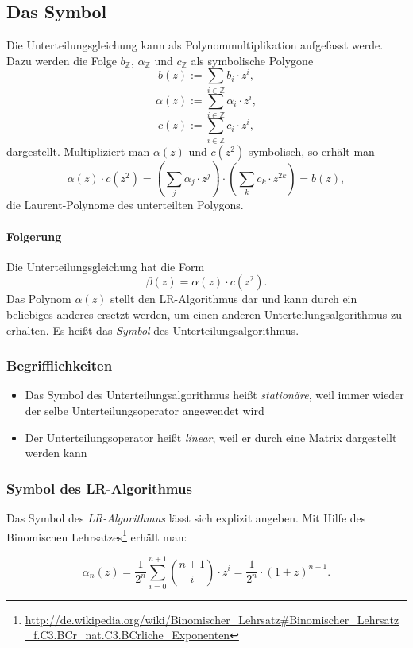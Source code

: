 \subsection{Das Symbol}
Die Unterteilungsgleichung kann als Polynommultiplikation aufgefasst werde. Dazu werden die Folge \(b_{\mathbb{Z}}\), \(\alpha_{\mathbb{Z}}\) und \(c_{\mathbb{Z}}\) als symbolische Polygone
\[b(z) := \sum_{i \in \mathbb{Z}} b_i \cdot z^i,\]
\[\alpha(z) := \sum_{i \in \mathbb{Z}} \alpha_i \cdot z^i,\]
\[c(z) := \sum_{i \in \mathbb{Z}} c_i \cdot z^i,\]
dargestellt. Multipliziert man \(\alpha(z)\) und \(c(z^2)\) symbolisch, so erhält man
\[\alpha(z) \cdot c(z^2) = \left(\sum_j \alpha_j\cdot z^j\right) \cdot \left(\sum_k c_k\cdot z^{2k}\right) = b(z),\]
die Laurent-Polynome des unterteilten Polygons.

\paragraph{Folgerung} Die Unterteilungsgleichung hat die Form
\[\beta(z) = \alpha(z)\cdot c(z^2).\]
Das Polynom \(\alpha(z)\) stellt den LR-Algorithmus dar und kann durch ein beliebiges anderes ersetzt werden, um einen anderen Unterteilungsalgorithmus zu erhalten. Es heißt das \textit{Symbol} des Unterteilungsalgorithmus.

\subsubsection{Begrifflichkeiten}
\begin{itemize}
	\item Das Symbol des Unterteilungsalgorithmus heißt \textit{stationäre}, weil immer wieder der selbe Unterteilungsoperator angewendet wird
	\item Der Unterteilungsoperator heißt \textit{linear}, weil er durch eine Matrix dargestellt werden kann
\end{itemize}

\subsubsection{Symbol des LR-Algorithmus}
Das Symbol des \textit{LR-Algorithmus} lässt sich explizit angeben. Mit Hilfe des Binomischen Lehrsatzes\footnote{\url{http://de.wikipedia.org/wiki/Binomischer_Lehrsatz\#Binomischer_Lehrsatz_f.C3.BCr_nat.C3.BCrliche_Exponenten}} erhält man:

\[\alpha_n(z) = \frac{1}{2^n} \sum_{i=0}^{n+1} \binom{n+1}{i} \cdot z^i = \frac{1}{2^n}\cdot (1+z)^{n+1}.\]



